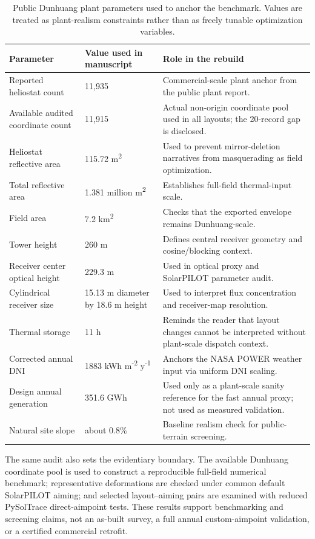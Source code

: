 \documentclass[final,3p,times]{elsarticle}
\begin{document}
\begin{table}[t]
\centering
\caption{Public Dunhuang plant parameters used to anchor the benchmark. Values are treated as plant-realism constraints rather than as freely tunable optimization variables.}
\label{tab:plant-audit}
\small
\begin{tabular}{p{}p{}p{}}
\toprule
Parameter & Value used in manuscript & Role in the rebuild \\
\midrule
Reported heliostat count & 11,935 & Commercial-scale plant anchor from the public plant report. \\
Available audited coordinate count & 11,915 & Actual non-origin coordinate pool used in all layouts; the 20-record gap is disclosed. \\
Heliostat reflective area & 115.72 m\textsuperscript{2} & Used to prevent mirror-deletion narratives from masquerading as field optimization. \\
Total reflective area & 1.381 million m\textsuperscript{2} & Establishes full-field thermal-input scale. \\
Field area & 7.2 km\textsuperscript{2} & Checks that the exported envelope remains Dunhuang-scale. \\
Tower height & 260 m & Defines central receiver geometry and cosine/blocking context. \\
Receiver center optical height & 229.3 m & Used in optical proxy and SolarPILOT parameter audit. \\
Cylindrical receiver size & 15.13 m diameter by 18.6 m height & Used to interpret flux concentration and receiver-map resolution. \\
Thermal storage & 11 h & Reminds the reader that layout changes cannot be interpreted without plant-scale dispatch context. \\
Corrected annual DNI & 1883 kWh m\textsuperscript{-2} y\textsuperscript{-1} & Anchors the NASA POWER weather input via uniform DNI scaling. \\
Design annual generation & 351.6 GWh & Used only as a plant-scale sanity reference for the fast annual proxy; not used as measured validation. \\
Natural site slope & about 0.8\% & Baseline realism check for public-terrain screening. \\
\bottomrule
\end{tabular}
\end{table}

The same audit also sets the evidentiary boundary. The available Dunhuang coordinate pool is used to construct a reproducible full-field numerical benchmark; representative deformations are checked under common default SolarPILOT aiming; and selected layout--aiming pairs are examined with reduced PySolTrace direct-aimpoint tests. These results support benchmarking and screening claims, not an as-built survey, a full annual custom-aimpoint validation, or a certified commercial retrofit.
\end{document}
